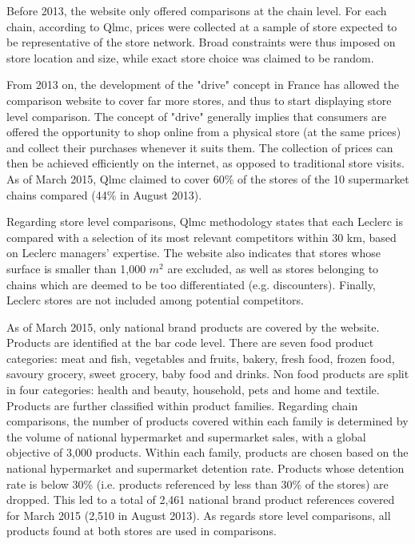 \documentclass[english]{article}
\begin{document}
Before 2013, the website only offered comparisons at the chain level. For each chain, according to Qlmc, prices were collected at a sample of store expected to be representative of the store network. Broad constraints were thus imposed on store location and size, while exact store choice was claimed to be random.

From 2013 on, the development of the "drive" concept in France has allowed the comparison website to cover far more stores, and thus to start displaying store level comparison. The concept of "drive" generally implies that consumers are offered the opportunity to shop online from a physical store (at the same prices) and collect their purchases whenever it suits them. The collection of prices can then be achieved efficiently on the internet, as opposed to traditional store visits. As of March 2015, Qlmc claimed to cover 60\% of the stores of the 10 supermarket chains compared (44\% in August 2013).

Regarding store level comparisons, Qlmc  methodology states that each Leclerc is compared with a selection of its most relevant competitors within 30 km, based on Leclerc managers' expertise. The website also indicates that stores whose surface is smaller than 1,000 $m^2$ are excluded, as well as stores belonging to chains which are deemed to be too differentiated (e.g. discounters). Finally, Leclerc stores are not included among potential competitors.

As of March 2015, only national brand products are covered by the website. Products are identified at the bar code level. There are seven food product categories: meat and fish, vegetables and fruits, bakery, fresh food, frozen food, savoury grocery, sweet grocery, baby food and drinks. Non food products are split in four categories: health and beauty, household, pets and home and textile. Products are further classified within product families. Regarding chain comparisons, the number of products covered within each family is determined by the volume of national hypermarket and supermarket sales, with a global objective of 3,000 products. Within each family, products are chosen based on the national hypermarket and supermarket detention rate. Products whose detention rate is below 30\% (i.e. products referenced by less than 30\% of the stores) are dropped. This led to a total of 2,461 national brand product references covered for March 2015 (2,510 in August 2013). As regards store level comparisons, all products found at both stores are used in comparisons.
\end{document}
